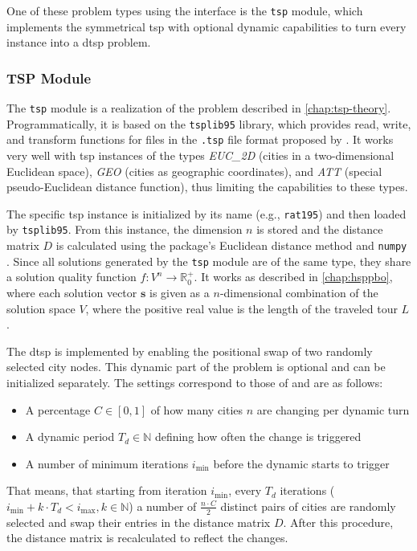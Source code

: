 One of these problem types using the interface is the \texttt{tsp} module, which implements the symmetrical \gls{tsp} with optional dynamic capabilities to turn every instance into a \gls{dtsp} problem.

\subsubsection{TSP Module}
\label{chap:tsp-module}

The \texttt{tsp} module is a realization of the problem described in \cref{chap:tsp-theory}. Programmatically, it is based on the \texttt{tsplib95} library, which provides read, write, and transform functions for files in the \texttt{.tsp} file format proposed by \citet{reinelt1991tsplib}. It works very well with \gls{tsp} instances of the types \textit{EUC\_2D} (cities in a two-dimensional Euclidean space), \textit{GEO} (cities as geographic coordinates), and \textit{ATT} (special pseudo-Euclidean distance function), thus limiting the capabilities to these types.

The specific \gls{tsp} instance is initialized by its name (e.g., \texttt{rat195}) and then loaded by \texttt{tsplib95}. From this instance, the dimension $n$ is stored and the distance matrix $D$ is calculated using the package's Euclidean distance method and \texttt{numpy} \cite{harris2020array}.
Since all solutions generated by the \texttt{tsp} module are of the same type, they share a solution quality function $f : V^n \rightarrow \mathbb{R}_{0}^{+}$. It works as described in \cref{chap:hsppbo}, where each solution vector $\mathbf{s}$ is given as a $n$-dimensional combination of the solution space $V$, where the positive real value is the length of the traveled tour $L$.

The \gls{dtsp} is implemented by enabling the positional swap of two randomly selected city nodes.
This dynamic part of the problem is optional and can be initialized separately. The settings correspond to those of \citet{kupfer2021hierarchical} and are as follows:
\begin{itemize}
	\item A percentage $C \in [0,1]$ of how many cities $n$ are changing per dynamic turn
	\item A dynamic period $T_{d} \in \mathbb{N}$ defining how often the change is triggered
	\item A number of minimum iterations $i_{\text{min}}$ before the dynamic starts to trigger
\end{itemize}
That means, that starting from iteration $i_{\text{min}}$, every $T_{d}$ iterations ($i_{\text{min}} + k \cdot T_{d} < i_{\text{max}}, k \in \mathbb{N}$) a number of $\frac{n\cdot C}{2}$ distinct pairs of cities are randomly selected and swap their entries in the distance matrix $D$. After this procedure, the distance matrix is recalculated to reflect the changes.

